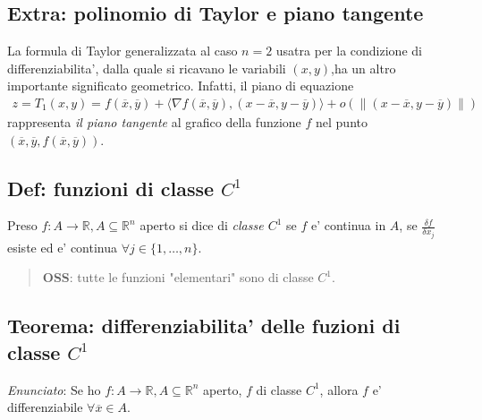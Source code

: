 \documentclass{article}
\begin{document}
\subsection{Extra: polinomio di Taylor e piano tangente}

La formula di Taylor generalizzata al caso $n = 2$ usatra per la condizione di
differenziabilita', dalla quale si ricavano le variabili $(x, y)$,ha un altro
importante significato geometrico. Infatti, il piano di equazione
\begin{align*}
  z = T_1(x, y) = f(\overline{x}, \overline{y}) + \langle \nabla f(\overline{x},
  \overline{y}), (x - \overline{x}, y - \overline{y}) \rangle + o(\|(x - \overline{x}, y - \overline{y})\|)
\end{align*}
rappresenta \emph{il piano tangente} al grafico della funzione $f$ nel punto
$(\overline{x}, \overline{y}, f(\overline{x}, \overline{y}))$.

\subsection{Def: funzioni di classe $C^1$}

Preso $f: A \to \mathbb{R}, A \subseteq \mathbb{R}^n$ aperto si dice di \emph{classe $C^1$}
se $f$ e' continua in $A$, se $\frac{\delta f}{\delta x_j}$ esiste ed e' continua $\forall j \in \{1,\ldots,n\}$.

\begin{quote}
  \textbf{OSS}: tutte le funzioni "elementari" sono di classe $C^1$.
\end{quote}

\subsection{Teorema: differenziabilita' delle fuzioni di classe $C^1$}

\emph{Enunciato}: Se ho $f: A \to \mathbb{R}, A \subseteq \mathbb{R}^n$ aperto,
$f$ di classe $C^1$, allora $f$ e' differenziabile $\forall \overline{x} \in A$. \\
\end{document}
